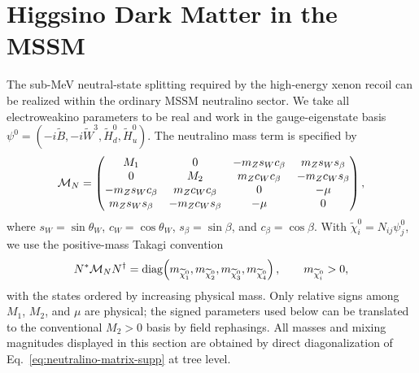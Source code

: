 \documentclass[%
  aps,
  prl,
  reprint,
  superscriptaddress,
  amsmath,
  amssymb,
  longbibliography
]{revtex4-2}
\begin{document}
\section{ Higgsino Dark Matter in the MSSM}
\label{sec:mssm-realization}


The sub-MeV neutral-state splitting required by the high-energy xenon
recoil can be realized within the ordinary MSSM neutralino sector.  We take
all electroweakino parameters to be real and work in the gauge-eigenstate
basis
\(\psi^0=(-i\widetilde B,-i\widetilde W^3,
\widetilde H_d^0,\widetilde H_u^0)\).  The neutralino mass term is specified
by
\begin{equation}
 {\cal M}_N=
 \begin{pmatrix}
 M_1 & 0 & -m_Zs_Wc_\beta & m_Zs_Ws_\beta \\
 0 & M_2 & m_Zc_Wc_\beta & -m_Zc_Ws_\beta \\
 -m_Zs_Wc_\beta & m_Zc_Wc_\beta & 0 & -\mu \\
 m_Zs_Ws_\beta & -m_Zc_Ws_\beta & -\mu & 0
 \end{pmatrix},
 \label{eq:neutralino-matrix-supp}
\end{equation}
where \(s_W=\sin\theta_W\), \(c_W=\cos\theta_W\),
\(s_\beta=\sin\beta\), and \(c_\beta=\cos\beta\).  With
\(\widetilde\chi_i^0=N_{ij}\psi_j^0\), we use the positive-mass Takagi
convention
\begin{equation}
 N^*{\cal M}_NN^\dagger
 ={\rm diag}\!\left(
 m_{\widetilde\chi_1^0},m_{\widetilde\chi_2^0},
 m_{\widetilde\chi_3^0},m_{\widetilde\chi_4^0}\right),
 \qquad m_{\widetilde\chi_i^0}>0 ,
 \label{eq:neutralino-diagonalization-supp}
\end{equation}
with the states ordered by increasing physical mass.  Only relative signs
among \(M_1\), \(M_2\), and \(\mu\) are physical; the signed parameters used
below can be translated to the conventional \(M_2>0\) basis by field
rephasings.  All masses and mixing magnitudes displayed in this section are
obtained by direct diagonalization of Eq.~\eqref{eq:neutralino-matrix-supp}
at tree level.
\end{document}
